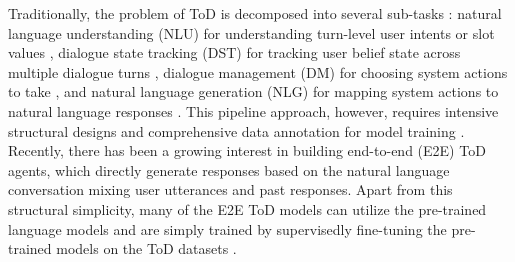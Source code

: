 Traditionally, the problem of ToD is decomposed into several sub-tasks \citep{smith1994spoken,young2013pomdp}:
natural language understanding (NLU) for understanding turn-level user intents or slot values \citep{tur2011spoken,casanueva2020efficient}, 
dialogue state tracking (DST)  for tracking user belief state across multiple dialogue turns \citep{zhang2019find,zhu2020convlab}, 
dialogue management (DM) for choosing system actions to take \citep{peng2017composite,zhao2019rethinking}, 
and natural language generation (NLG) for mapping system actions to natural language responses \citep{wen2015semantically,damd2020}.
This pipeline approach, however, requires intensive structural designs and comprehensive data annotation for model training \citep{kwan2022survey}.
Recently, there has been a growing interest in building end-to-end (E2E) ToD agents, which directly
generate responses based on the natural language conversation mixing user utterances and past responses.
Apart from this structural simplicity, many of the E2E ToD models can utilize the pre-trained language models and are simply trained by supervisedly fine-tuning the pre-trained models on the ToD datasets \citep[\eg,][]{simpletod2020,ham2020end,mintl2020,soloist2021}. 

